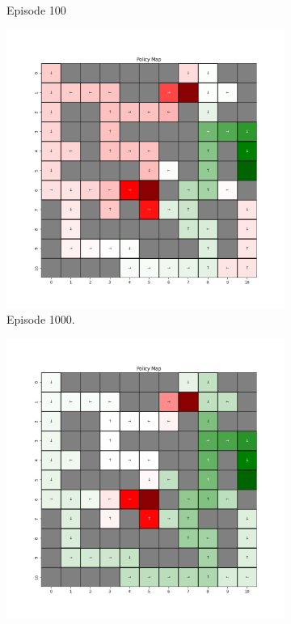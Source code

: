 \documentclass{assignment}
\begin{document}
\begin{figure}[H]
\begin{subfigure}{0.3\textwidth}
    \caption{Episode 100}
    \end{subfigure}
    \begin{subfigure}{0.3\textwidth}
        \includegraphics[width=\textwidth]{figures/policy_td/epsilon_sweep/policy_alpha_0.1_gamma_0.95_epsilon_0.0_iteration_1000.png}
    \caption{Episode 1000.}
    \end{subfigure}\hfill
    \begin{subfigure}{0.3\textwidth}
        \includegraphics[width=\textwidth]{figures/policy_td/epsilon_sweep/policy_alpha_0.1_gamma_0.95_epsilon_0.0_iteration_5000.png}

\end{subfigure}
\end{figure}
\end{document}

